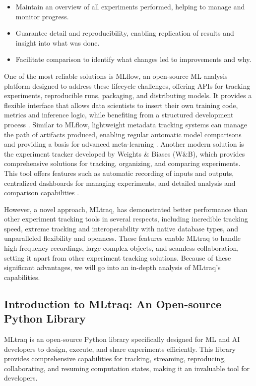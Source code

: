 \begin{itemize}
\begin{itemize}
    \item Maintain an overview of all experiments performed, helping to manage and monitor progress.
    \item Guarantee detail and reproducibility, enabling replication of results and insight into what was done.
    \item Facilitate comparison to identify what changes led to improvements and why.
\end{itemize}

One of the most reliable solutions is MLflow, an open-source ML analysis platform designed to address these lifecycle challenges, offering APIs for tracking experiments, reproducible runs, packaging, and distributing models. It provides a flexible interface that allows data scientists to insert their own training code, metrics and inference logic, while benefiting from a structured development process \cite{zaharia2018accelerating}. Similar to MLflow, lightweight metadata tracking systems can manage the path of artifacts produced, enabling regular automatic model comparisons and providing a basis for advanced meta-learning \cite{schelter2017automatically}. Another modern solution is the experiment tracker developed by Weights \& Biases (W\&B), which provides comprehensive solutions for tracking, organizing, and comparing experiments. This tool offers features such as automatic recording of inputs and outputs, centralized dashboards for managing experiments, and detailed analysis and comparison capabilities \cite{wandb2023}.

However, a novel approach, MLtraq, has demonstrated better performance than other experiment tracking tools in several respects, including incredible tracking speed, extreme tracking and interoperability with native database types, and unparalleled flexibility and openness. These features enable MLtraq to handle high-frequency recordings, large complex objects, and seamless collaboration, setting it apart from other experiment tracking solutions. Because of these significant advantages, we will go into an in-depth analysis of MLtraq's capabilities.

\subsection{Introduction to MLtraq: An Open-source Python Library}

MLtraq is an open-source Python library specifically designed for ML and AI developers to design, execute, and share experiments efficiently. This library provides comprehensive capabilities for tracking, streaming, reproducing, collaborating, and resuming computation states, making it an invaluable tool for developers. \cite{mltraq2024}


\end{itemize}
